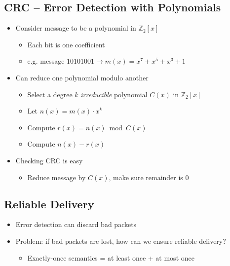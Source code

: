 \subsection{CRC -- Error Detection with Polynomials}
\begin{itemize}[nosep]
    \item Consider message to be a polynomial in $\mathbb{Z}_2[x]$
          \begin{itemize}[nosep]
              \item Each bit is one coefficient
              \item e.g. message $10101001 \to m(x) = x^7 + x^5 + x^3 + 1$
          \end{itemize}
    \item Can reduce one polynomial modulo another
          \begin{itemize}[nosep]
              \item Select a degree $k$ \emph{irreducible} polynomial $C(x)$ in $\mathbb{Z}_2[x]$
              \item Let $n(x) = m(x)\cdot x^k$
              \item Compute $r(x) = n(x) \bmod C(x)$
              \item Compute $n(x) - r(x)$
          \end{itemize}
    \item Checking CRC is easy
          \begin{itemize}
              \item Reduce message by $C(x)$, make sure remainder is 0
          \end{itemize}
\end{itemize}
\subsection{Reliable Delivery}
\begin{itemize}
    \item Error detection can discard bad packets
    \item Problem: if bad packets are lost, how can we ensure reliable delivery?
          \begin{itemize}[nosep]
              \item Exactly-once semantics = at least once + at most once
          \end{itemize}
\end{itemize}

